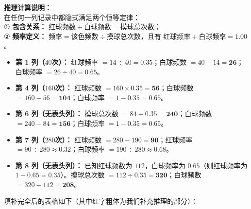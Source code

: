 \vspace{0.2cm}
\textbf{推理计算说明：}\\
在任何一列记录中都隐式满足两个恒等定律：\\
① \textbf{包含关系：} $\text{红球频数} + \text{白球频数} = \text{摸球总次数}$；\\
② \textbf{频率定义：} $\text{频率} = \text{该色频数} \div \text{摸球总次数}$，且有 $\text{红球频率} + \text{白球频率} = 1.00$。
\begin{itemize}
  \item \textbf{第 1 列（$40$次）：} 红球频率 $= 14 \div 40 = \boldsymbol{0.35}$；白球频数 $= 40 - 14 = \boldsymbol{26}$；白球频率 $= 26 \div 40 = \boldsymbol{0.65}$。
  \item \textbf{第 4 列（$160$次）：} 红球频数 $= 160 \times 0.35 = \boldsymbol{56}$；白球频数 $= 160 - 56 = \boldsymbol{104}$；白球频率 $= 1 - 0.35 = \boldsymbol{0.65}$。
  \item \textbf{第 6 列（无表头列）：} 摸球总次数 $= 84 \div 0.35 = \boldsymbol{240}$；白球频数 $= 240 - 84 = \boldsymbol{156}$；白球频率 $= 1 - 0.35 = \boldsymbol{0.65}$。
  \item \textbf{第 7 列（$280$次）：} 红球频数 $= 280 - 190 = \boldsymbol{90}$；红球频率 $= 90 \div 280 \approx \boldsymbol{0.32}$；白球频率 $= 190 \div 280 \approx \boldsymbol{0.68}$。
  \item \textbf{第 8 列（无表头列）：} 已知红球频数为 $112$，白球频率为 $0.65$（则红球频率为 $1 - 0.65 = \boldsymbol{0.35}$）。摸球总次数 $= 112 \div 0.35 = \boldsymbol{320}$；白球频数 $= 320 - 112 = \boldsymbol{208}$。
\end{itemize}

填补完全后的表格如下（其中红字粗体为我们补充推理的部分）：

